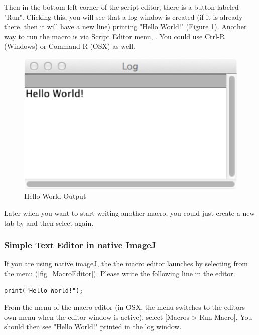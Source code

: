 Then in the bottom-left corner of the script editor, there is a button labeled "Run". Clicking this, you will see that a log window is created (if it is already there, then it will have a new line) printing "Hello World!" (Figure \ref{fig_HelloWorldLog}). Another way to run the macro is via Script Editor menu,   . You could use Ctrl-R (Windows) or Command-R (OSX) as well.  

\begin{figure}[hbtp]
\begin{center}
\includegraphics[scale=1.0]{fig/helloworld_logwindow.png}
\caption{Hello World Output} \label{fig_HelloWorldLog}
\end{center}
\end{figure}

Later when you want to start writing another macro, you could just create a new tab by  and then select  again.

\subsubsection{Simple Text Editor in native ImageJ}
\label{part:nativeeditor}

If you are using native imageJ, the the macro editor launches by selecting  from the menu (\ref{fig_MacroEditor}). 
Please write the following line in the editor. 
\begin{lstlisting}[numbers=none]
print("Hello World!");
\end{lstlisting}
From the menu of the macro editor (in OSX, the menu switches to the editors own menu when the editor window is active), select [Macros > Run Macro]. You should then see "Hello World!" printed in the log window. 


